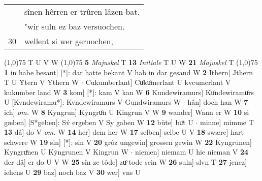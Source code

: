 \documentclass[8pt,a4paper,notitlepage]{article}
\begin{document}
\begin{table}[ht]
\begin{minipage}[t]{0.5\linewidth}
\begin{tabular}{rl}
 & sînen hêrren er trûren lâzen bat.\\ 
 & "wir suln ez baz versuochen.\\ 
30 & wellent si wer geruochen,\\ 
\end{tabular}
\scriptsize
\line(1,0){75} \newline
T U V W \newline
\line(1,0){75} \newline
\textbf{5} \textit{Majuskel} T  \textbf{13} \textit{Initiale} T U W  \textbf{21} \textit{Majuskel} T  \newline
\line(1,0){75} \newline
\textbf{1} in habe besant] [*]: dar hatte bekant V hab in dar gesand W \textbf{2} Ithern] Jthern T U Ẏtern V Ythern W  $\cdot$ Cukumberlant] Cuͦkuͦmerlant U kvcumerlant V kukumber land W \textbf{3} kom] [*]: kam V kan W \textbf{6} Kundewiramurs] Kuͦndewiramuͦrs U [Kvndewiramu*]: Kvndewiramurs V Gundwiramurs W  $\cdot$ hân] doch han W \textbf{7} ich] \textit{om.} W \textbf{8} Kyngrun] Kyngruͦn U Kingrun V W \textbf{9} wander] Wann er W \textbf{10} si gæben] [S*geben]: Sv́ ergeben V Sy gaben W \textbf{12} büte] buͦt U  $\cdot$ minne] mimme T \textbf{13} dâ] do V \textit{om.} W \textbf{14} her] dem her W \textbf{17} selben] selbe U V \textbf{18} swære] hart schwere W \textbf{19} sin] [*]: sin V \textbf{20} grôz ungewin] grossen gewin W \textbf{22} Kyngrunen] Kyngruͦnen U Kẏngrunen V Kingrun W  $\cdot$ niemen] niemam U hie nieman V \textbf{24} der dâ] er do U V W \textbf{25} sîn ze tôde] zuͦ tode sein W \textbf{26} suln] slvn T \textbf{27} jenez] iehens U \textbf{29} baz] noch baz V \textbf{30} wer] vns U \newline
\end{minipage}
\end{table}
\end{document}
